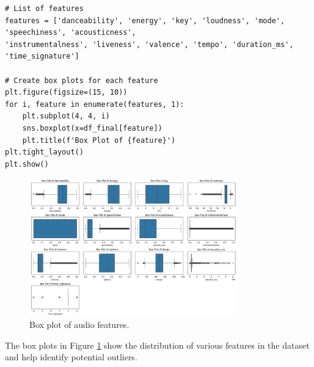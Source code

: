 \begin{verbatim}
# List of features
features = ['danceability', 'energy', 'key', 'loudness', 'mode', 'speechiness', 'acousticness', 
'instrumentalness', 'liveness', 'valence', 'tempo', 'duration_ms', 'time_signature']
    
# Create box plots for each feature
plt.figure(figsize=(15, 10))
for i, feature in enumerate(features, 1):
    plt.subplot(4, 4, i)
    sns.boxplot(x=df_final[feature])
    plt.title(f'Box Plot of {feature}')
plt.tight_layout()
plt.show()
\end{verbatim}

\newpage

\begin{figure}[h]
    \centering
    \includegraphics[width=0.8\textwidth]{media/outlier.png} 
    \caption{Box plot of audio features.}
    \label{box_plot}
\end{figure}


The box plots in Figure \ref{box_plot} show the distribution of various features in the dataset and help identify potential outliers.

